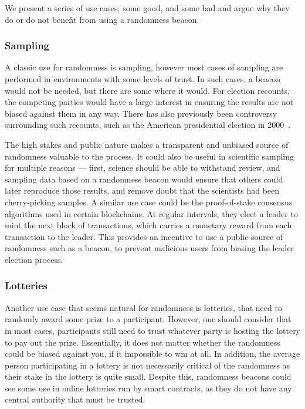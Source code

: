 We present a series of use cases; some good, and some bad and argue why they do or do not benefit from using a randomness beacon.

\subsubsection{Sampling}
A classic use for randomness is sampling, however most cases of sampling are performed in environments with some levels of trust.
In such cases, a beacon would not be needed, but there are some where it would.
For election recounts, the competing parties would have a large interest in ensuring the results are not biased against them in any way.
There has also previously been controversy surrounding such recounts, such as the American presidential election in 2000~\cite{bushgore}.

The high stakes and public nature makes a transparent and unbiased source of randomness valuable to the process.
It could also be useful in scientific sampling for multiple reasons --- first, science should be able to withstand review, and sampling data based on a randomness beacon would ensure that others could later reproduce those results, and remove doubt that the scientists had been cherry-picking samples.
A similar use case could be the proof-of-stake consensus algorithms used in certain blockchains.
At regular intervals, they elect a leader to mint the next block of transactions, which carries a monetary reward from each transaction to the leader.
This provides an incentive to use a public source of randomness such as a beacon, to prevent malicious users from biasing the leader election process.

\subsubsection{Lotteries}
Another use case that seems natural for randomness is lotteries, that need to randomly award some prize to a participant. However, one should consider that in most cases, participants still need to trust whatever party is hosting the lottery to pay out the prize. Essentially, it does not matter whether the randomness could be biased against you, if it impossible to win at all.
In addition, the average person participating in a lottery is not necessarily critical of the randomness as their stake in the lottery is quite small.
Despite this, randomness beacons could see some use in online lotteries run by smart contracts, as they do not have any central authority that must be trusted.

